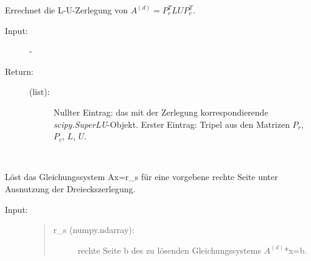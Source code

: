 \documentclass[letterpaper,10pt,ngerman, oneside, openright]{sphinxmanual}
\begin{document}
\begin{fulllineitems}
\begin{fulllineitems}
\begin{description}
\end{description}

\end{fulllineitems}


\begin{fulllineitems}
\label{\detokenize{index:sparse_erw.Sparse.l_u_zerl}}
Errechnet die L-U-Zerlegung von $A^{(d)}=P_r^TLUP_c^T$.

\begin{description}
\item [{Input:}] -
\end{description}
\begin{description}
\item[{Return:}] \leavevmode\begin{description}
\item[{(list):}] \leavevmode
Nullter Eintrag: das mit der Zerlegung korrespondierende \textit{scipy.SuperLU}-Objekt.
Erster Eintrag: Tripel aus den Matrizen $P_r$, $P_c$, $L$, $U$.

\end{description}

\end{description}

\end{fulllineitems}


\begin{fulllineitems}
\label{\detokenize{index:sparse_erw.Sparse.lgs_lsg}}~%

Löst das Gleichungssystem Ax=r\_s für eine vorgebene rechte Seite unter Ausnutzung der
Dreieckszerlegung.

\begin{description}
\item [{Input:}]

\begin{quote}
\begin{description}
\item[{r\_s (numpy.ndarray):}] \leavevmode
rechte Seite b des zu lösenden Gleichungssystems $A^{(d)}$*x=b.

\end{description}
\end{quote}\end{description}


\end{fulllineitems}
\end{fulllineitems}
\end{document}
